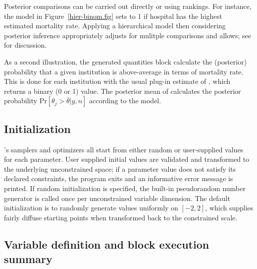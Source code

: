 \documentclass[article]{jss}
\begin{document}
Posterior comparisons can be carried out directly or using rankings.
For instance, the model in Figure~\ref{hier-binom.fig} sets
 to 1 if hospital  has the highest estimated
mortality rate.  Applying a hierarchical model then considering
posterior inference appropriately adjusts for mulitple comparisons and
allows; see \citep{GelmanEtAl:2012, Efron:2010} for discussion.

As a second illustration, the generated quantities block calculate the
(posterior) probability that a given institution is above-average in
terms of mortality rate.  This is done for each institution 
with the usual plug-in estimate of ,
which returns a binary (0 or 1) value.  The posterior mean of
 calculates the posterior probability
$\mbox{Pr}[\theta_j > \bar{\theta}|y,n]$ according to the model.

\subsection{Initialization}

's samplers and optimizers all start from either random
or user-supplied values for each parameter.  User
supplied initial values are validated and transformed to
the underlying unconstrained space; if a parameter value does not satisfy its
declared constraints, the program exits and an informative error
message is printed.  If random initialization is specified, the
built-in pseudorandom number generator is called once per
unconstrained variable dimension.  The default initialization is to
randomly generate values uniformly on $[-2,2]$, which supplies fairly
diffuse starting points when transformed back to the constrained
scale.

\subsection{Variable definition and block execution summary}
\end{document}

